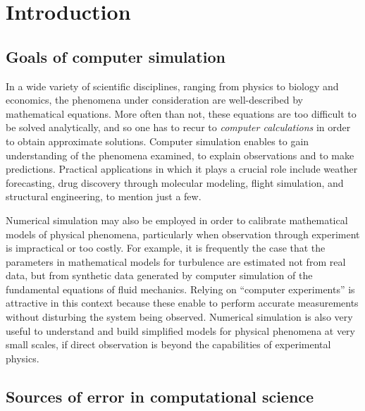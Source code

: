 \chapter*{Introduction}%

\section*{Goals of computer simulation}%
\label{sec:goals_of_computer_simulation}

In a wide variety of scientific disciplines,
ranging from physics to biology and economics,
the phenomena under consideration are well-described by mathematical equations.
More often than not,
these equations are too difficult to be solved analytically,
and so one has to recur to \emph{computer calculations} in order to obtain approximate solutions.
Computer simulation enables to gain understanding of the phenomena examined,
to explain observations and to make predictions.
Practical applications in which it plays a crucial role include
weather forecasting, drug discovery through molecular modeling,
flight simulation, and structural engineering, to mention just a few.


Numerical simulation may also be employed in order to calibrate mathematical models of physical phenomena,
particularly when observation through experiment is impractical or too costly.
For example, it is frequently the case that the parameters in mathematical models for turbulence are estimated not from real data,
but from synthetic data generated by computer simulation of the fundamental equations of fluid mechanics.
Relying on ``computer experiments'' is attractive in this context because
these enable to perform accurate measurements without disturbing the system being observed.
Numerical simulation is also very useful to understand and build simplified models for physical phenomena at very small scales,
if direct observation is beyond the capabilities of experimental physics.

\section*{Sources of error in computational science}%
\label{sec:sources_of_error}


